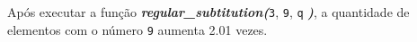 \documentclass[12pt,varwidth=16cm,border=1pt]{standalone}
\begin{document}
Após executar a função \textbf{\textit{regular\_subtitution(}}\verb+3+, \verb+9+, \verb+q+ \textbf{\textit{)}}, a quantidade de elementos com o número \verb+9+ aumenta 2.01 vezes.

\questiomtrue
\end{document}
